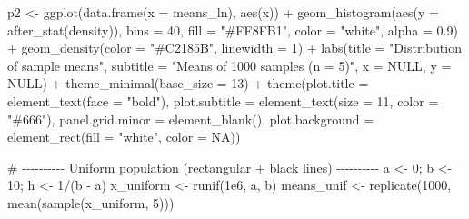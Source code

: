 \documentclass[
  letterpaper,
  DIV=11,
  numbers=noendperiod]{scrreprt}
\newenvironment{Shaded}{\begin{snugshade}}{\end{snugshade}}
\newcommand{\AttributeTok}[1]{\textcolor[rgb]{0.40,0.45,0.13}{#1}}
\newcommand{\CommentTok}[1]{\textcolor[rgb]{0.37,0.37,0.37}{#1}}
\newcommand{\ConstantTok}[1]{\textcolor[rgb]{0.56,0.35,0.01}{#1}}
\newcommand{\DecValTok}[1]{\textcolor[rgb]{0.68,0.00,0.00}{#1}}
\newcommand{\FloatTok}[1]{\textcolor[rgb]{0.68,0.00,0.00}{#1}}
\newcommand{\FunctionTok}[1]{\textcolor[rgb]{0.28,0.35,0.67}{#1}}
\newcommand{\NormalTok}[1]{\textcolor[rgb]{0.00,0.23,0.31}{#1}}
\newcommand{\OtherTok}[1]{\textcolor[rgb]{0.00,0.23,0.31}{#1}}
\newcommand{\SpecialCharTok}[1]{\textcolor[rgb]{0.37,0.37,0.37}{#1}}
\newcommand{\StringTok}[1]{\textcolor[rgb]{0.13,0.47,0.30}{#1}}
\begin{document}
\begin{Shaded}
\begin{Highlighting}[]
\NormalTok{p2 }\OtherTok{\textless{}{-}} \FunctionTok{ggplot}\NormalTok{(}\FunctionTok{data.frame}\NormalTok{(}\AttributeTok{x =}\NormalTok{ means\_ln), }\FunctionTok{aes}\NormalTok{(x)) }\SpecialCharTok{+}
  \FunctionTok{geom\_histogram}\NormalTok{(}\FunctionTok{aes}\NormalTok{(}\AttributeTok{y =} \FunctionTok{after\_stat}\NormalTok{(density)),}
                 \AttributeTok{bins =} \DecValTok{40}\NormalTok{, }\AttributeTok{fill =} \StringTok{"\#FF8FB1"}\NormalTok{, }\AttributeTok{color =} \StringTok{"white"}\NormalTok{, }\AttributeTok{alpha =} \FloatTok{0.9}\NormalTok{) }\SpecialCharTok{+}
  \FunctionTok{geom\_density}\NormalTok{(}\AttributeTok{color =} \StringTok{"\#C2185B"}\NormalTok{, }\AttributeTok{linewidth =} \DecValTok{1}\NormalTok{) }\SpecialCharTok{+}
  \FunctionTok{labs}\NormalTok{(}\AttributeTok{title =} \StringTok{"Distribution of sample means"}\NormalTok{,}
       \AttributeTok{subtitle =} \StringTok{"Means of 1000 samples (n = 5)"}\NormalTok{,}
       \AttributeTok{x =} \ConstantTok{NULL}\NormalTok{, }\AttributeTok{y =} \ConstantTok{NULL}\NormalTok{) }\SpecialCharTok{+}
  \FunctionTok{theme\_minimal}\NormalTok{(}\AttributeTok{base\_size =} \DecValTok{13}\NormalTok{) }\SpecialCharTok{+}
  \FunctionTok{theme}\NormalTok{(}\AttributeTok{plot.title =} \FunctionTok{element\_text}\NormalTok{(}\AttributeTok{face =} \StringTok{"bold"}\NormalTok{),}
        \AttributeTok{plot.subtitle =} \FunctionTok{element\_text}\NormalTok{(}\AttributeTok{size =} \DecValTok{11}\NormalTok{, }\AttributeTok{color =} \StringTok{"\#666"}\NormalTok{),}
        \AttributeTok{panel.grid.minor =} \FunctionTok{element\_blank}\NormalTok{(),}
        \AttributeTok{plot.background =} \FunctionTok{element\_rect}\NormalTok{(}\AttributeTok{fill =} \StringTok{"white"}\NormalTok{, }\AttributeTok{color =} \ConstantTok{NA}\NormalTok{))}


\CommentTok{\# {-}{-}{-}{-}{-}{-}{-}{-}{-}{-} Uniform population (rectangular + black lines) {-}{-}{-}{-}{-}{-}{-}{-}{-}{-}}
\NormalTok{a }\OtherTok{\textless{}{-}} \DecValTok{0}\NormalTok{; b }\OtherTok{\textless{}{-}} \DecValTok{10}\NormalTok{; h }\OtherTok{\textless{}{-}} \DecValTok{1}\SpecialCharTok{/}\NormalTok{(b }\SpecialCharTok{{-}}\NormalTok{ a)}
\NormalTok{x\_uniform }\OtherTok{\textless{}{-}} \FunctionTok{runif}\NormalTok{(}\FloatTok{1e6}\NormalTok{, a, b)}
\NormalTok{means\_unif }\OtherTok{\textless{}{-}} \FunctionTok{replicate}\NormalTok{(}\DecValTok{1000}\NormalTok{, }\FunctionTok{mean}\NormalTok{(}\FunctionTok{sample}\NormalTok{(x\_uniform, }\DecValTok{5}\NormalTok{)))}


\end{Highlighting}
\end{Shaded}
\end{document}
